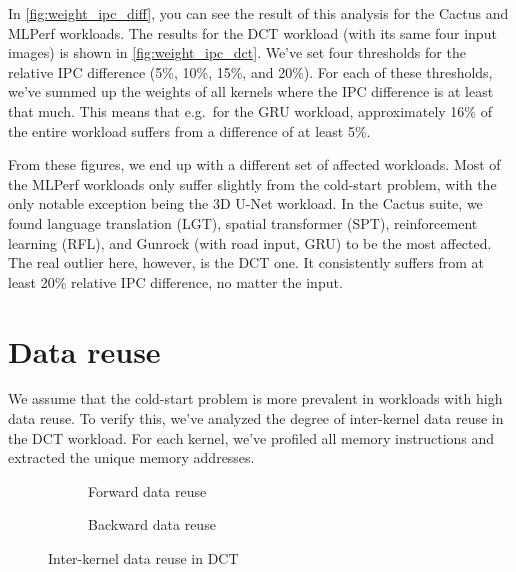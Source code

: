 In \cref{fig:weight_ipc_diff}, you can see the result of this analysis for the Cactus and MLPerf workloads.
The results for the DCT workload (with its same four input images) is shown in \cref{fig:weight_ipc_dct}.
We've set four thresholds for the relative IPC difference (5\%, 10\%, 15\%, and 20\%).
For each of these thresholds, we've summed up the weights of all kernels where the IPC difference is at least that much.
This means that e.g.\ for the GRU workload, approximately 16\% of the entire workload suffers from a difference of at least 5\%.

From these figures, we end up with a different set of affected workloads.
Most of the MLPerf workloads only suffer slightly from the cold-start problem, with the only notable exception being the 3D U-Net workload.
In the Cactus suite, we found language translation (LGT), spatial transformer (SPT), reinforcement learning (RFL), and Gunrock (with road input, GRU) to be the most affected.
The real outlier here, however, is the DCT one.
It consistently suffers from at least 20\% relative IPC difference, no matter the input.

\FloatBarrier

\section{Data reuse}\label{sec:data-reuse}
We assume that the cold-start problem is more prevalent in workloads with high data reuse.
To verify this, we've analyzed the degree of inter-kernel data reuse in the DCT workload.
For each kernel, we've profiled all memory instructions and extracted the unique memory addresses.

\begin{figure}[ht]
    \centering
    \begin{subfigure}{0.4\textwidth}
        \resizebox{\textwidth}{!}{}
        \caption{Forward data reuse}
        \label{fig:dct_forward_reuse}
    \end{subfigure}
    \begin{subfigure}{0.4\textwidth}
        \resizebox{\textwidth}{!}{}
        \caption{Backward data reuse}
        \label{fig:dct_backward_reuse}
    \end{subfigure}
    \caption{Inter-kernel data reuse in DCT}
    \label{fig:dct_reuse}
\end{figure}

